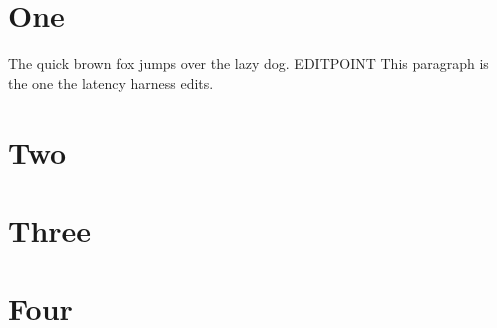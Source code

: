 \documentclass{article}
\begin{document}
\section{One}
The quick brown fox jumps over the lazy dog. EDITPOINT This paragraph is the
one the latency harness edits.
\lipsum[1-15]
\section{Two}
\lipsum[16-35]
\section{Three}
\lipsum[36-60]
\section{Four}
\lipsum[61-100]
\end{document}
